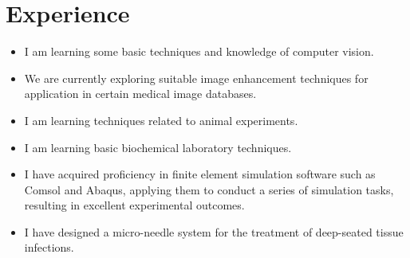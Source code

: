 \documentclass{resume}
\begin{document}

\section{Experience}

\begin{itemize}
\item I am learning some basic techniques and knowledge of computer vision.
\item We are currently exploring suitable image enhancement techniques for application in certain medical image databases.
\end{itemize}

\begin{itemize}
\item I am learning techniques related to animal experiments.
\item I am learning basic biochemical laboratory techniques.
\end{itemize}

\begin{itemize}
\item I have acquired proficiency in finite element simulation software such as Comsol and Abaqus, applying them to conduct a series of simulation tasks, resulting in excellent experimental outcomes.
\item I have designed a micro-needle system for the treatment of deep-seated tissue infections.
\end{itemize}
\end{document}

